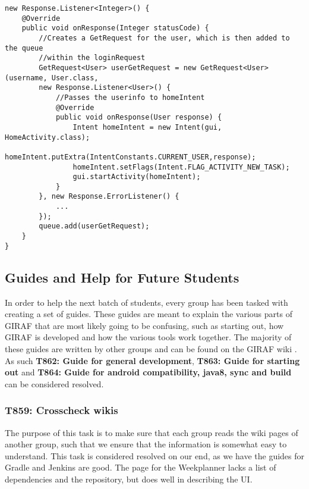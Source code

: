 \begin{minipage}[H]{\linewidth}
\begin{lstlisting}[caption = If the user information is authenticated we proceed
with a request for user, label = userReq] new Response.Listener<Integer>() {
	@Override
    public void onResponse(Integer statusCode) {
    	//Creates a GetRequest for the user, which is then added to the queue
    	//within the loginRequest 
    	GetRequest<User> userGetRequest = new GetRequest<User>(username, User.class, 
    	new Response.Listener<User>() {
        	//Passes the userinfo to homeIntent
            @Override
            public void onResponse(User response) {
            	Intent homeIntent = new Intent(gui, HomeActivity.class);
                homeIntent.putExtra(IntentConstants.CURRENT_USER,response);
                homeIntent.setFlags(Intent.FLAG_ACTIVITY_NEW_TASK);
                gui.startActivity(homeIntent);
            }
        }, new Response.ErrorListener() {
			...
        });
        queue.add(userGetRequest);
	}
}
\end{lstlisting}
\end{minipage}



\subsection{Guides and Help for Future Students}
In order to help the next batch of students, every group has been tasked with
creating a set of guides. These guides are meant to explain the various
parts of GIRAF that are most likely going to be confusing, such as starting out,
how GIRAF is developed and how the various tools work together. The
majority of these guides are written by other groups and can be found on the
GIRAF wiki \citep{GWiki}. As such \textbf{T862: Guide for general development},
\textbf{T863: Guide for starting out} and \textbf{T864: Guide for android
compatibility, java8, sync and build} can be considered resolved.

\subsubsection{T859: Crosscheck wikis}
The purpose of this task is to make sure that each group reads the wiki pages of
another group, such that we ensure that the information is somewhat easy to
understand. This task is considered resolved on our end, as we have the guides
for Gradle and Jenkins are good. The page for the Weekplanner lacks a
list of dependencies and the repository, but does well in describing the UI.


